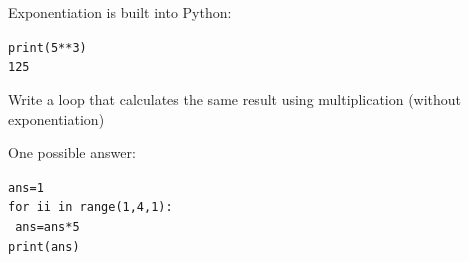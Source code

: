 \documentclass{beamer}
\begin{document}

\begin{frame}{ }

Exponentiation is built into Python:

\vspace{0.5cm}

\begin{beamerboxesrounded}[upper=uppercolgreen,lower=lowercolgreen,shadow=false]{}

\texttt{print(5**3)\\
125}
\end{beamerboxesrounded}

\vspace{0.5cm}

Write a loop that calculates the same result using multiplication (without exponentiation)

\alert{One possible answer:}

\texttt{ans=1}\\
\texttt{for ii in range(1,4,1):}\\
\texttt{      ans=ans*5}\\
\texttt{print(ans)}

\end{frame}

\end{document}
